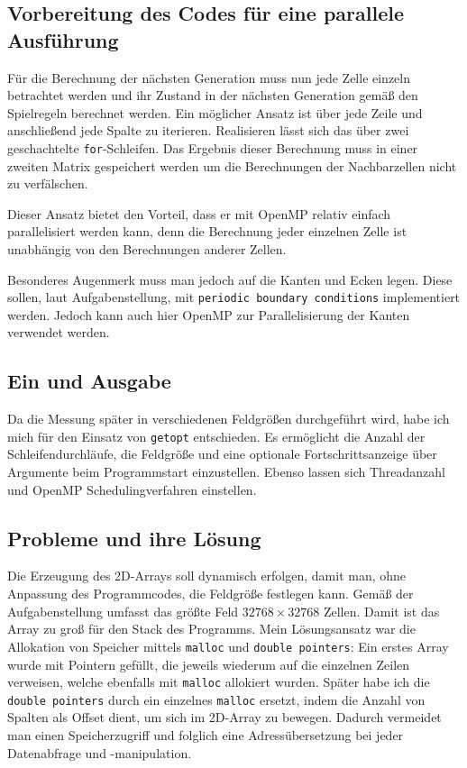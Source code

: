 \documentclass[german,plainarticle,hyperref,utf8]{zihpub}
\begin{document}
	\subsection{Vorbereitung des Codes für eine parallele Ausführung}
	Für die Berechnung der nächsten Generation muss nun jede Zelle einzeln betrachtet werden und ihr Zustand in der nächsten Generation gemäß den Spielregeln berechnet werden.
	Ein möglicher Ansatz ist über jede Zeile und anschließend jede Spalte zu iterieren. Realisieren lässt sich das über zwei geschachtelte \verb|for|-Schleifen. Das Ergebnis dieser Berechnung muss in einer zweiten Matrix gespeichert werden um die Berechnungen der Nachbarzellen nicht zu verfälschen.
	
	Dieser Ansatz bietet den Vorteil, dass er mit OpenMP relativ einfach parallelisiert werden kann, denn die Berechnung jeder einzelnen Zelle ist unabhängig von den Berechnungen anderer Zellen.
	
	Besonderes Augenmerk muss man jedoch auf die Kanten und Ecken legen. Diese sollen, laut Aufgabenstellung, mit \verb|periodic boundary conditions| implementiert werden. Jedoch kann auch hier OpenMP zur Parallelisierung der Kanten verwendet werden.

	\subsection{Ein und Ausgabe}
	Da die Messung später in verschiedenen Feldgrößen durchgeführt wird, habe ich mich für den Einsatz von \verb|getopt| entschieden. Es ermöglicht die Anzahl der Schleifendurchläufe, die Feldgröße und eine optionale Fortschrittsanzeige über Argumente beim Programmstart einzustellen.
	Ebenso lassen sich Threadanzahl und OpenMP Schedulingverfahren einstellen.
	
	\subsection{Probleme und ihre Lösung}
	Die Erzeugung des 2D-Arrays soll dynamisch erfolgen, damit man, ohne Anpassung des Programmcodes, die Feldgröße festlegen kann. Gemäß der Aufgabenstellung umfasst das größte Feld $32768\times 32768$ Zellen. Damit ist das Array zu groß für den Stack des Programms.
	Mein Lösungsansatz war die Allokation von Speicher mittels \verb|malloc| und \verb|double pointers|: Ein erstes Array wurde mit Pointern gefüllt, die jeweils wiederum auf die einzelnen Zeilen verweisen, welche ebenfalls mit \verb|malloc| allokiert wurden.
	Später habe ich die \verb|double pointers| durch ein einzelnes \verb|malloc| ersetzt, indem die Anzahl von Spalten als Offset dient, um sich im 2D-Array zu bewegen. Dadurch vermeidet man einen Speicherzugriff und folglich eine Adressübersetzung bei jeder Datenabfrage und -manipulation.
	
\end{document}
